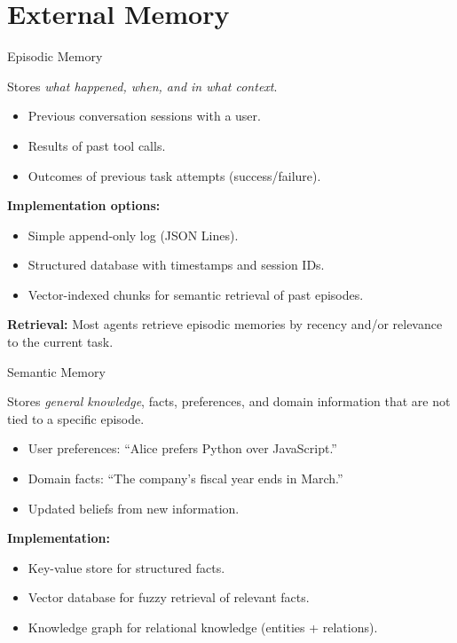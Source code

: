 \documentclass[aspectratio=169,10pt]{beamer}
\begin{document}
\section{External Memory}

\begin{frame}{Episodic Memory}
  \begin{tcolorbox}[hitbox, title=Episodic Memory = Log of Past Experiences]
    Stores \emph{what happened, when, and in what context}.
    \begin{itemize}
      \item Previous conversation sessions with a user.
      \item Results of past tool calls.
      \item Outcomes of previous task attempts (success/failure).
    \end{itemize}
  \end{tcolorbox}
  \vspace{0.4em}
  \textbf{Implementation options:}
  \begin{itemize}
    \item Simple append-only log (JSON Lines).
    \item Structured database with timestamps and session IDs.
    \item Vector-indexed chunks for semantic retrieval of past episodes.
  \end{itemize}
  \vspace{0.3em}
  \textbf{Retrieval:} Most agents retrieve episodic memories by recency and/or relevance to the current task.
\end{frame}

\begin{frame}{Semantic Memory}
  \begin{tcolorbox}[hitbox, title=Semantic Memory = Facts About the World]
    Stores \emph{general knowledge}, facts, preferences, and domain information
    that are not tied to a specific episode.
    \begin{itemize}
      \item User preferences: ``Alice prefers Python over JavaScript.''
      \item Domain facts: ``The company's fiscal year ends in March.''
      \item Updated beliefs from new information.
    \end{itemize}
  \end{tcolorbox}
  \vspace{0.4em}
  \textbf{Implementation:}
  \begin{itemize}
    \item Key-value store for structured facts.
    \item Vector database for fuzzy retrieval of relevant facts.
    \item Knowledge graph for relational knowledge (entities + relations).
  \end{itemize}
\end{frame}
\end{document}

